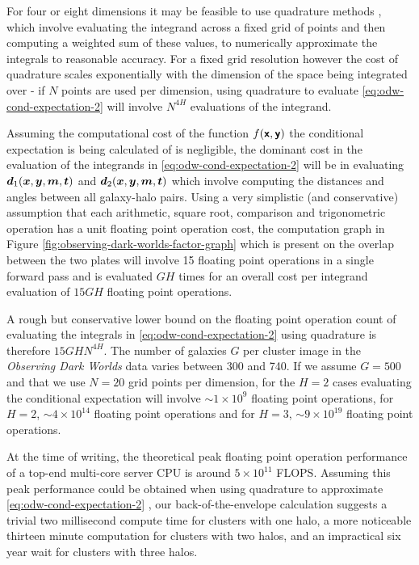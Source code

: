 For four or eight dimensions it may be feasible to use quadrature methods \citep{davis1967numerical}, which involve evaluating the integrand across a fixed grid of points and then computing a weighted sum of these values, to numerically approximate the integrals to reasonable accuracy. For a fixed grid resolution however the cost of quadrature scales exponentially with the dimension of the space being integrated over - if $N$ points are used per dimension, using quadrature to evaluate \eqref{eq:odw-cond-expectation-2} will involve $N^{4H}$ evaluations of the integrand. 

Assuming the computational cost of the function $f(\boldsymbol{\mathsf{x}},\boldsymbol{\mathsf{y}})$ the conditional expectation is being calculated of is negligible, the dominant cost in the evaluation of the integrands in \eqref{eq:odw-cond-expectation-2} will be in evaluating $\boldsymbol{d}_1(\boldsymbol{x},\boldsymbol{y},\boldsymbol{m},\boldsymbol{t})$ and $\boldsymbol{d}_2(\boldsymbol{x},\boldsymbol{y},\boldsymbol{m},\boldsymbol{t})$ which involve computing the distances and angles between all galaxy-halo pairs. Using a very simplistic (and conservative) assumption that each arithmetic, square root, comparison and trigonometric operation has a unit floating point operation cost, the computation graph in Figure \ref{fig:observing-dark-worlds-factor-graph} which is present on the overlap between the two plates will involve 15 floating point operations in a single forward pass and is evaluated $GH$ times for an overall cost per integrand evaluation of $15GH$ floating point operations. 

A rough but conservative lower bound on the floating point operation count of evaluating the integrals in \eqref{eq:odw-cond-expectation-2} using quadrature is therefore $15 GH N^{4H}$. The number of galaxies $G$ per cluster image in the \emph{Observing Dark Worlds} data varies between 300 and 740. If we assume $G=500$ and that we use $N=20$ grid points per dimension, for the $H=2$ cases evaluating the conditional expectation will involve $\sim 1\times 10^9$ floating point operations, for $H=2$, $\sim 4 \times 10^{14}$ floating point operations and for $H=3$, $\sim 9\times 10^{19}$ floating point operations.

At the time of writing, the theoretical peak floating point operation performance of a top-end multi-core server \ac{CPU} is around $5 \times 10^{11}$ \ac{FLOPS}. Assuming this peak performance could be obtained when using quadrature to approximate \eqref{eq:odw-cond-expectation-2}
, our back-of-the-envelope calculation suggests a trivial two millisecond compute time for clusters with one halo, a more noticeable thirteen minute computation for clusters with two halos, and an impractical six year wait for clusters with three halos.

